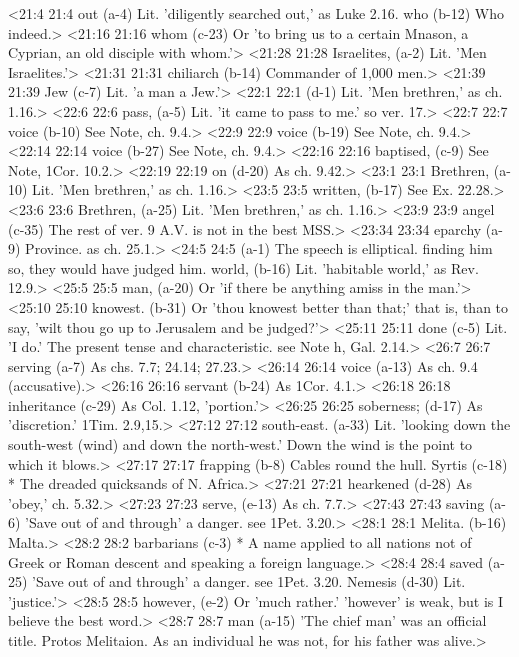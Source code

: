 <21:4 21:4  out (a-4)  Lit. 'diligently searched out,' as Luke 2.16.
  who (b-12)  Who indeed.>
<21:16 21:16  whom (c-23)  Or 'to bring us to a certain Mnason, a Cyprian, an old  disciple with whom.'>
<21:28 21:28  Israelites, (a-2)  Lit. 'Men Israelites.'>
<21:31 21:31  chiliarch (b-14)  Commander of 1,000 men.>
<21:39 21:39  Jew (c-7)  Lit. 'a man a Jew.'>
<22:1 22:1   (d-1)  Lit. 'Men brethren,' as ch. 1.16.>
<22:6 22:6  pass, (a-5)  Lit. 'it came to pass to me.' so ver. 17.>
<22:7 22:7  voice (b-10) See Note, ch. 9.4.>
<22:9 22:9  voice (b-19) See Note, ch. 9.4.>
<22:14 22:14  voice (b-27)  See Note, ch. 9.4.>
<22:16 22:16  baptised, (c-9)  See Note, 1Cor. 10.2.>
<22:19 22:19  on (d-20)  As ch. 9.42.>
<23:1 23:1  Brethren, (a-10) Lit. 'Men brethren,' as ch. 1.16.>
<23:5 23:5  written, (b-17)  See Ex. 22.28.>
<23:6 23:6  Brethren, (a-25)  Lit. 'Men brethren,' as ch. 1.16.>
<23:9 23:9  angel (c-35)  The rest of ver. 9 A.V. is not in the best MSS.>
<23:34 23:34  eparchy (a-9)  Province. as ch. 25.1.>
<24:5 24:5   (a-1)  The speech is elliptical. finding him so, they would have  judged him.
  world, (b-16)  Lit. 'habitable world,' as Rev. 12.9.>
<25:5 25:5  man, (a-20)  Or 'if there be anything amiss in the man.'>
<25:10 25:10  knowest. (b-31)  Or 'thou knowest better than that;' that is, than to say,  'wilt thou go up to Jerusalem and be judged?'>
<25:11 25:11  done (c-5)  Lit. 'I do.' The present tense and characteristic. see Note  h, Gal. 2.14.>
<26:7 26:7  serving (a-7)  As chs. 7.7; 24.14; 27.23.>
<26:14 26:14  voice (a-13)  As ch. 9.4 (accusative).>
<26:16 26:16  servant (b-24)  As 1Cor. 4.1.>
<26:18 26:18  inheritance (c-29)  As Col. 1.12, 'portion.'>
<26:25 26:25  soberness; (d-17)  As 'discretion.' 1Tim. 2.9,15.>
<27:12 27:12  south-east. (a-33)  Lit. 'looking down the south-west (wind) and down the  north-west.' Down the wind is the point to which it blows.>
<27:17 27:17  frapping (b-8)  Cables round the hull.
  Syrtis (c-18)  * The dreaded quicksands of N. Africa.>
<27:21 27:21  hearkened (d-28)  As 'obey,' ch. 5.32.>
<27:23 27:23  serve, (e-13)  As ch. 7.7.>
<27:43 27:43  saving (a-6) 'Save out of and through' a danger. see 1Pet. 3.20.>
<28:1 28:1  Melita. (b-16)  Malta.>
<28:2 28:2  barbarians (c-3)  * A name applied to all nations not of Greek or Roman descent  and speaking a foreign language.>
<28:4 28:4  saved (a-25)  'Save out of and through' a danger. see 1Pet. 3.20.
  Nemesis (d-30)  Lit. 'justice.'>
<28:5 28:5  however, (e-2)  Or 'much rather.' 'however' is weak, but is I believe the  best word.>
<28:7 28:7  man (a-15)  'The chief man' was an official title. Protos Melitaion. As  an individual he was not, for his father was alive.>

